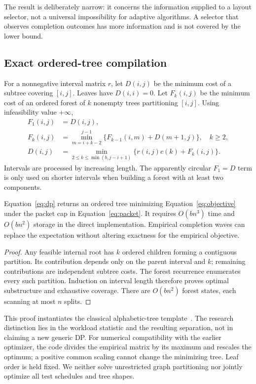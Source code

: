 \documentclass[11pt]{article}
\theoremstyle{definition}\newtheorem{definition}[theorem]{Definition}
\theoremstyle{remark}\newtheorem{remark}[theorem]{Remark}
\begin{document}
The result is deliberately narrow: it concerns the information supplied to a layout selector, not a universal impossibility for adaptive algorithms. A selector that observes completion outcomes has more information and is not covered by the lower bound.

\subsection{Exact ordered-tree compilation}
For a nonnegative interval matrix $r$, let $D(i,j)$ be the minimum cost of a subtree covering $[i,j]$. Leaves have $D(i,i)=0$. Let $F_k(i,j)$ be the minimum cost of an ordered forest of $k$ nonempty trees partitioning $[i,j]$. Using infeasibility value $+\infty$,
\begin{align}
 F_1(i,j)&=D(i,j),\\
 F_k(i,j)&=\min_{m=i+k-2}^{j-1}\{F_{k-1}(i,m)+D(m+1,j)\},\quad k\ge2,\\
 D(i,j)&=\min_{2\le k\le\min(b,j-i+1)}\{r(i,j)c(k)+F_k(i,j)\}.\label{eq:dp}
\end{align}
Intervals are processed by increasing length. The apparently circular $F_1=D$ term is only used on shorter intervals when building a forest with at least two components.

\begin{proposition}\label{prop:dp}
Equation~\eqref{eq:dp} returns an ordered tree minimizing Equation~\eqref{eq:objective} under the packet cap in Equation~\eqref{eq:packet}. It requires $O(bn^3)$ time and $O(bn^2)$ storage in the direct implementation. Empirical completion waves can replace the expectation without altering exactness for the empirical objective.
\end{proposition}
\begin{proof}
Any feasible internal root has $k$ ordered children forming a contiguous partition. Its contribution depends only on the parent interval and $k$; remaining contributions are independent subtree costs. The forest recurrence enumerates every such partition. Induction on interval length therefore proves optimal substructure and exhaustive coverage. There are $O(bn^2)$ forest states, each scanning at most $n$ splits.\end{proof}

This proof instantiates the classical alphabetic-tree template~\cite{alphabetic}. The research distinction lies in the workload statistic and the resulting separation, not in claiming a new generic DP. For numerical compatibility with the earlier optimizer, the code divides the empirical matrix by its maximum and rescales the optimum; a positive common scaling cannot change the minimizing tree. Leaf order is held fixed. We neither solve unrestricted graph partitioning nor jointly optimize all test schedules and tree shapes.
\end{document}
